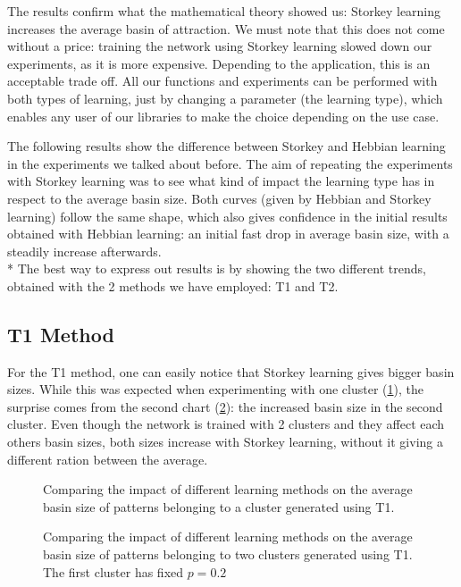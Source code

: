 The results confirm what the mathematical theory showed us: Storkey learning
increases the average basin of attraction. We must note that this does not
come without a price: training the network using Storkey learning slowed down
our experiments, as it is more expensive. Depending to the application, this
is an acceptable trade off. All our functions and experiments can be performed
with both types of learning, just by changing a parameter (the learning type),
which enables any user of our libraries to make the choice depending on the
use case.

The following results show the difference between Storkey and Hebbian learning in the experiments we talked about before.
The aim of repeating the experiments with Storkey learning was to see what kind of impact the learning type has in respect to the average basin size.
Both curves (given by Hebbian and Storkey learning) follow the same shape, which also gives confidence in the initial results obtained with Hebbian learning: an initial fast drop in
average basin size, with a steadily increase afterwards.
\\*
The best way to express out results is by showing the two different trends, obtained with the 2 methods we have employed: T1 and T2.

\subsection{T1 Method}

For the T1 method, one can easily notice that Storkey learning gives bigger basin sizes. While this was expected when experimenting with one cluster
 (\ref{fig:plot-storkey-T1-onecluster}), the surprise comes from the second chart (\ref{fig:plot-storkey-T1-twoclusters}): the  increased basin size in the second cluster. Even though the network is trained with 2 clusters
and they affect each others basin sizes, both sizes increase with Storkey learning, without it giving a different ration between the average.


\begin{figure}[h]
  \centering
  
\caption{Comparing the impact of different learning methods on the average basin size of patterns belonging to a cluster generated using T1.}
\label{fig:plot-storkey-T1-onecluster}
\end{figure}

\begin{figure}[h]
  \centering
  
\caption{Comparing the impact of different learning methods on the average basin size of patterns belonging to two clusters generated using T1. The first cluster has fixed $p = 0.2$}
\label{fig:plot-storkey-T1-twoclusters}
\end{figure}


